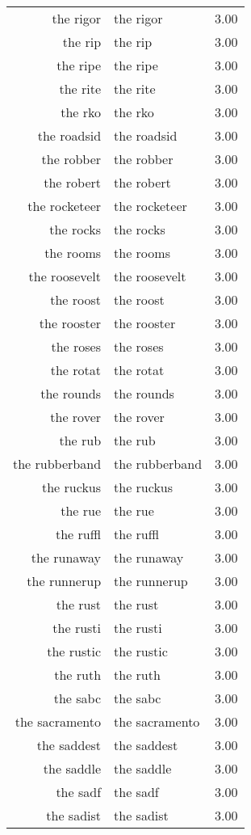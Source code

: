 \begin{table}[ht]
\begin{tabular}{rlr}
  the rigor & the rigor & 3.00 \\ 
  the rip & the rip & 3.00 \\ 
  the ripe & the ripe & 3.00 \\ 
  the rite & the rite & 3.00 \\ 
  the rko & the rko & 3.00 \\ 
  the roadsid & the roadsid & 3.00 \\ 
  the robber & the robber & 3.00 \\ 
  the robert & the robert & 3.00 \\ 
  the rocketeer & the rocketeer & 3.00 \\ 
  the rocks & the rocks & 3.00 \\ 
  the rooms & the rooms & 3.00 \\ 
  the roosevelt & the roosevelt & 3.00 \\ 
  the roost & the roost & 3.00 \\ 
  the rooster & the rooster & 3.00 \\ 
  the roses & the roses & 3.00 \\ 
  the rotat & the rotat & 3.00 \\ 
  the rounds & the rounds & 3.00 \\ 
  the rover & the rover & 3.00 \\ 
  the rub & the rub & 3.00 \\ 
  the rubberband & the rubberband & 3.00 \\ 
  the ruckus & the ruckus & 3.00 \\ 
  the rue & the rue & 3.00 \\ 
  the ruffl & the ruffl & 3.00 \\ 
  the runaway & the runaway & 3.00 \\ 
  the runnerup & the runnerup & 3.00 \\ 
  the rust & the rust & 3.00 \\ 
  the rusti & the rusti & 3.00 \\ 
  the rustic & the rustic & 3.00 \\ 
  the ruth & the ruth & 3.00 \\ 
  the sabc & the sabc & 3.00 \\ 
  the sacramento & the sacramento & 3.00 \\ 
  the saddest & the saddest & 3.00 \\ 
  the saddle & the saddle & 3.00 \\ 
  the sadf & the sadf & 3.00 \\ 
  the sadist & the sadist & 3.00 \\ 

\end{tabular}
\end{table}
